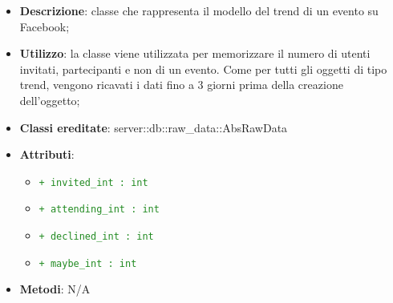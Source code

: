 				\begin{itemize}
					\item \textbf{Descrizione}: classe che rappresenta il modello del trend di un evento su Facebook;
					\item \textbf{Utilizzo}: la classe viene utilizzata per memorizzare il numero di utenti invitati, partecipanti e non di un evento. Come per tutti gli oggetti di tipo trend, vengono ricavati i dati fino a 3 giorni prima della creazione dell'oggetto;
					\item \textbf{Classi ereditate}: server::db::raw\_data::AbsRawData
					\item \textbf{Attributi}:
					\begin{itemize}
						\item \textcolor{forestgreen}{\texttt{+ invited\_int : int}}
						\item \textcolor{forestgreen}{\texttt{+ attending\_int : int}}
						\item \textcolor{forestgreen}{\texttt{+ declined\_int : int}}
						\item \textcolor{forestgreen}{\texttt{+ maybe\_int : int}}
					\end{itemize}
					\item \textbf{Metodi}: N/A
				\end{itemize}


